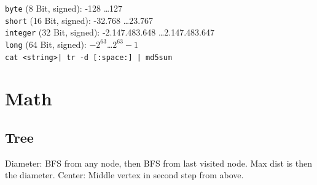 \documentclass[10pt,a4paper,ngerman,oneside,]{article}
\begin{document}
\begin{multicols}{2}
{}

\vspace{1em}
\noindent
\texttt{byte} (8 Bit, signed): -128 \dots 127\\
\texttt{short} (16 Bit, signed): -32.768 \dots 23.767\\
\texttt{integer} (32 Bit, signed): -2.147.483.648 \dots 2.147.483.647\\
\texttt{long} (64 Bit, signed): $-2^{63}$\dots $2^{63}-1$\\

\newcommand{\hash}[1]{{\bfseries MD5:} ~\texttt{#1}}
\vspace{1.2em} \texttt{\small cat <string>| tr -d [:space:] | md5sum}\\


\section{Math}
\subsection{Tree}
Diameter: BFS from any node, then BFS from last visited node.
Max dist is then the diameter.
Center: Middle vertex in second step from above.

\end{multicols}
\end{document}

